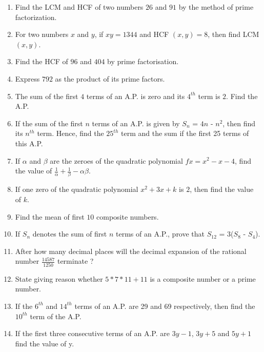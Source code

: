 \documentclass[10pt]{article}
\begin{document}
\begin{enumerate}
	\item Find the LCM and HCF of two numbers $26$ and $91$ by the method of prime factorization.
	\item For two numbers $x$ and $y$, if $xy = 1344$ and HCF $(x,y) = 8$, then find LCM$(x, y)$.
	\item Find the HCF of $96$ and $404$ by prime factorisation.
	\item Express $792$ as the product of its prime factors.
	\item The sum of the first $4$ terms of an A.P. is zero and its $4^{th}$ term is $2$. Find the A.P.
	\item If the sum of the first $n$ terms of an A.P. is given by $S_n$ = $4n$ - $n^2$, then find its $n^{th}$ term. Hence, find the $25^{th}$ term and the sum if the first 25 terms of this A.P.
	\item If $\alpha$ and $\beta$ are the zeroes of the quadratic polynomial $f{x} = x^{2} - x - 4$, find the value of $\frac{1}{\alpha} + \frac{1}{\beta} - {\alpha \beta}$.
	\item If one zero of the quadratic polynomial $x^{2} +  3x + k$ is $2$, then find the value of $k$.
	\item Find the mean of first $10$ composite numbers.
	\item If $S_n$ denotes the sum of first $n$ terms of an A.P., prove that $S_{12}$ = 3($S_8$ - $S_4$).
	\item After how many decimal places will the decimal expansion of the rational number $\frac{14587}{1250}$ terminate ?			
	\item State giving reason whether $5*7*11 +11$ is a composite number or a prime number.
	\item If the $6^{th}$ and $14^{th}$ terms of an A.P. are 29 and 69 respectively, then find the $10^{th}$ term of the A.P.
	\item If the first three consecutive terms of an A.P. are $3y-1$, $3y+5$ and $5y+1$ find the value of y. 
\end{enumerate}
\end{document}
